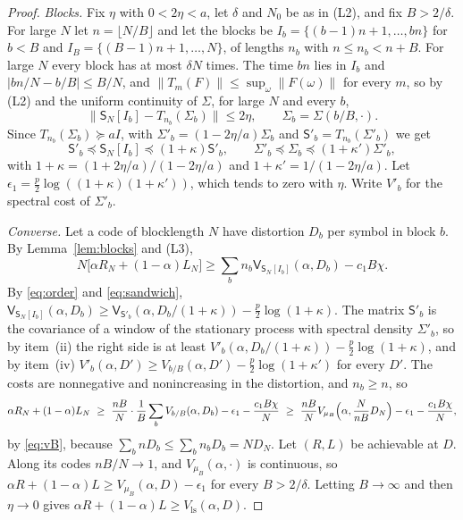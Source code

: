 \documentclass[11pt,onecolumn]{IEEEtran}
\newcommand{\Vls}{V_{\mathrm{ls}}}
\begin{document}
\begin{proof}
\emph{Blocks.} Fix $\eta$ with $0<2\eta<a$, let $\delta$ and $N_0$ be
as in (L2), and fix $B>2/\delta$. For large $N$ let
$n=\lfloor N/B\rfloor$ and let the blocks be
$I_b=\{(b-1)n+1,\dots,bn\}$ for $b<B$ and
$I_B=\{(B-1)n+1,\dots,N\}$, of lengths $n_b$ with $n\le n_b<n+B$. For
large $N$ every block has at most $\delta N$ times. The time $bn$ lies
in $I_b$ and $|bn/N-b/B|\le B/N$, and
$\|T_m(F)\|\le\sup_\omega\|F(\omega)\|$ for every $m$, so by (L2) and the
uniform continuity of $\Sigma$, for large $N$ and every $b$,
\begin{equation}
\bigl\|\mathsf S_N[I_b]-T_{n_b}(\Sigma_b)\bigr\|\le2\eta,\qquad\Sigma_b=\Sigma(b/B,\cdot).
\label{eq:close}
\end{equation}
Since $T_{n_b}(\Sigma_b)\succeq aI$, with $\Sigma'_b=(1-2\eta/a)\Sigma_b$
and $\mathsf S'_b=T_{n_b}(\Sigma'_b)$ we get
\begin{equation}
\mathsf S'_b\preceq\mathsf S_N[I_b]\preceq(1+\kappa)\mathsf S'_b,\qquad
\Sigma'_b\preceq\Sigma_b\preceq(1+\kappa')\Sigma'_b,
\label{eq:sandwich}
\end{equation}
with $1+\kappa=(1+2\eta/a)/(1-2\eta/a)$ and $1+\kappa'=1/(1-2\eta/a)$.
Let $\epsilon_1=\tfrac p2\log((1+\kappa)(1+\kappa'))$, which tends to
zero with $\eta$. Write $V'_b$ for the spectral cost of $\Sigma'_b$.

\emph{Converse.} Let a code of blocklength $N$ have distortion $D_b$
per symbol in block $b$. By Lemma~\ref{lem:blocks} and (L3),
\[
N\bigl[\alpha R_N+(1-\alpha)L_N\bigr]\ge\sum_bn_b\mathsf V_{\mathsf S_N[I_b]}(\alpha,D_b)-c_1B\chi .
\]
By \eqref{eq:order} and \eqref{eq:sandwich},
$\mathsf V_{\mathsf S_N[I_b]}(\alpha,D_b)\ge\mathsf V_{\mathsf S'_b}(\alpha,D_b/(1+\kappa))-\tfrac p2\log(1+\kappa)$.
The matrix $\mathsf S'_b$ is the covariance of a window of the
stationary process with spectral density $\Sigma'_b$, so by item~(ii)
the right side is at least
$V'_b(\alpha,D_b/(1+\kappa))-\tfrac p2\log(1+\kappa)$, and by item~(iv)
$V'_b(\alpha,D')\ge V_{b/B}(\alpha,D')-\tfrac p2\log(1+\kappa')$ for every
$D'$. The costs are nonnegative and nonincreasing in the distortion,
and $n_b\ge n$, so
\[
\alpha R_N+(1-\alpha)L_N\ \ge\ \frac{nB}{N}\cdot\frac1B\sum_bV_{b/B}(\alpha,D_b)-\epsilon_1-\frac{c_1B\chi}{N}
\ \ge\ \frac{nB}{N}V_{\mu_B}\Bigl(\alpha,\frac{N}{nB}D_N\Bigr)-\epsilon_1-\frac{c_1B\chi}{N},
\]
by \eqref{eq:vB}, because $\sum_bnD_b\le\sum_bn_bD_b=ND_N$. Let
$(R,L)$ be achievable at $D$. Along its codes $nB/N\to1$, and
$V_{\mu_B}(\alpha,\cdot)$ is continuous, so
$\alpha R+(1-\alpha)L\ge V_{\mu_B}(\alpha,D)-\epsilon_1$ for every
$B>2/\delta$. Letting $B\to\infty$ and then $\eta\to0$ gives
$\alpha R+(1-\alpha)L\ge\Vls(\alpha,D)$.


\end{proof}
\end{document}
